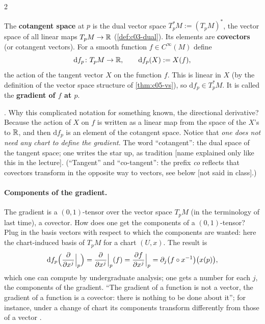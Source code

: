 \begin{paracol}{2}
\begin{definition}\label{def:c05-cotangent}
The \textbf{cotangent space} at $p$ is the dual vector space $T^*_pM:=(T_pM)^*$, the vector space of all linear maps $T_pM\to\mathbb{R}$ (\cref{def:c03-dual}). Its elements are \textbf{covectors} (or cotangent vectors).
For a smooth function $f\in C^\infty(M)$ define
\[
  \mathrm df_p\colon T_pM\to\mathbb{R},\qquad\mathrm df_p(X):=X(f),
\]
the action of the tangent vector $X$ on the function $f$. This is linear in $X$ (by the definition of the vector space structure of \cref{thm:c05-vs}), so $\mathrm df_p\in T^*_pM$. It is called the \textbf{gradient of $f$ at $p$}.
\end{definition}
.
Why this complicated notation for something known, the directional derivative? Because the action of $X$ on $f$ is written as a linear map from the space of the $X$'s to $\mathbb{R}$, and then $\mathrm df_p$ is an element of the cotangent space. Notice that \emph{one does not need any chart to define the gradient}. The word ``cotangent'': the dual space of the tangent space; one writes the star up, as tradition [name explained only like this in the lecture].
(``Tangent'' and ``co-tangent'': the prefix \emph{co} reflects that covectors transform in the opposite way to vectors, see below [not said in class].)

\paragraph{Components of the gradient.} The gradient is a $(0,1)$-tensor over the vector space $T_pM$ (in the terminology of last time), a covector. How does one get the components of a $(0,1)$-tensor? Plug in the basis vectors with respect to which the components are wanted: here the chart-induced basis of $T_pM$ for a chart $(U,x)$. The result is
\[
  \mathrm df_p\Bigl(\frac{\partial}{\partial x^j}\Big|_p\Bigr)=\frac{\partial}{\partial x^j}\Big|_p(f)=\frac{\partial f}{\partial x^j}\Big|_p=\partial_j\bigl(f\circ x^{-1}\bigr)\bigl(x(p)\bigr),
\]
which one can compute by undergraduate analysis; one gets a number for each $j$, the components of the gradient. ``The gradient of a function is not a vector, the gradient of a function is a covector: there is nothing to be done about it''; for instance, under a change of chart its components transform differently from those of a vector .


\end{paracol}
